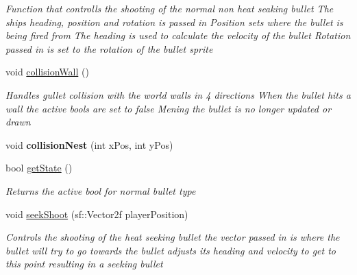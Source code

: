 \begin{DoxyCompactItemize}
\begin{DoxyCompactList}\small\item\em Function that controlls the shooting of the normal non heat seaking bullet The ships heading, position and rotation is passed in Position sets where the bullet is being fired from The heading is used to calculate the velocity of the bullet Rotation passed in is set to the rotation of the bullet sprite \end{DoxyCompactList}\item 
void \mbox{\hyperlink{class_bullet_a4315a4cef5fc227efbd64a099ac748fb}{collision\+Wall}} ()
\begin{DoxyCompactList}\small\item\em Handles gullet collision with the world walls in 4 directions When the bullet hits a wall the active bools are set to false Mening the bullet is no longer updated or drawn \end{DoxyCompactList}\item 
\mbox{\label{class_bullet_a90ac3ad6ec7b69d9026e545f315a244f}} 
void {\bfseries collision\+Nest} (int x\+Pos, int y\+Pos)
\item 
bool \mbox{\hyperlink{class_bullet_a50c5b3bb7dfaad883ba11e06cf7ec1d1}{get\+State}} ()
\begin{DoxyCompactList}\small\item\em Returns the active bool for normal bullet type \end{DoxyCompactList}\item 
void \mbox{\hyperlink{class_bullet_a7a61dfd6c3d2a192a1a2b1da7c808f71}{seek\+Shoot}} (sf\+::\+Vector2f player\+Position)
\begin{DoxyCompactList}\small\item\em Controls the shooting of the heat seeking bullet the vector passed in is where the bullet will try to go towards the bullet adjusts its heading and velocity to get to this point resulting in a seeking bullet \end{DoxyCompactList}\end{DoxyCompactItemize}
